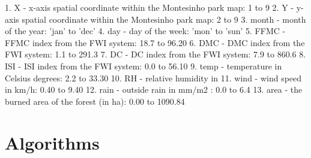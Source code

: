 \documentclass[runningheads]{llncs}
\begin{document}
1. X - x-axis spatial coordinate within the Montesinho park map: 1 to 9\hfill\break{}
2. Y - y-axis spatial coordinate within the Montesinho park map: 2 to 9\hfill\break{}
3. month - month of the year: 'jan' to 'dec'\hfill\break{}
4. day - day of the week: 'mon' to 'sun'\hfill\break{}
5. FFMC - FFMC index from the FWI system: 18.7 to 96.20\hfill\break{}
6. DMC - DMC index from the FWI system: 1.1 to 291.3\hfill\break{}
7. DC - DC index from the FWI system: 7.9 to 860.6\hfill\break{}
8. ISI - ISI index from the FWI system: 0.0 to 56.10\hfill\break{}
9. temp - temperature in Celsius degrees: 2.2 to 33.30\hfill\break{}
10. RH - relative humidity in %
11. wind - wind speed in km/h: 0.40 to 9.40\hfill\break{}
12. rain - outside rain in mm/m2 : 0.0 to 6.4\hfill\break{}
13. area - the burned area of the forest (in ha): 0.00 to 1090.84\hfill

\section{Algorithms}
\end{document}
